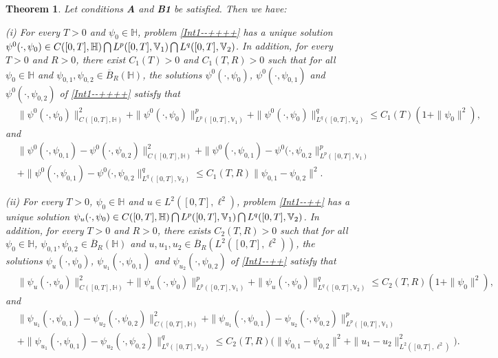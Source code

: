 \documentclass[11pt]{article}
\renewcommand{\leq}{\leqslant}
\newtheorem{theorem}{Theorem}[section]
\numberwithin{equation}{section}
\begin{document}
\begin{theorem}\label{Con1}
Let conditions {\bf A} and {\bf B1} be satisfied.
Then we have:

(i) For every $T>0$ and $\psi_0\in \mathbb{H}$, problem \eqref{Int1--++++} has a unique solution $\psi^0(\cdot,\psi_0)\in
C([0,T],\mathbb{H} )\bigcap L^p([0,T], \mathbb{V}_1  )\\ \bigcap L^q([0,T], \mathbb{V}_2)$. In addition, for every $T>0$ and $R>0$, there exist $C_1(T)>0$ and $C_1(T,R)>0$ such that for all $\psi_{0}\in\mathbb{H}$ and $\psi_{0,1},\psi_{0,2}\in \overline{B}_{R}(\mathbb{H})$,
the solutions $\psi^0(\cdot,\psi_0)$, $\psi^0(\cdot,\psi_{0,1})$
and $\psi^0(\cdot,\psi_{0,2})$ of  \eqref{Int1--++++} satisfy that
\begin{align}\label{Con2}
&\|\psi^0(\cdot,\psi_0)\|^2_{C([0,T],\mathbb{H} )}+
\|\psi^0(\cdot,\psi_0)\|^p_{L^p([0,T],\mathbb{V}_1 )}+\|\psi^0(\cdot,\psi_0)\|^q_{L^q([0,T], \mathbb{V}_2)}\leq C_1(T)(1+\|\psi_0\|^2),
\end{align}
and
\begin{align}\label{Con3}&
\|\psi^0(\cdot,\psi_{0,1})-
\psi^0(\cdot,\psi_{0,2})
\|^2_{C([0,T],\mathbb{H} )}+
\|\psi^0(\cdot,\psi_{0,1})-
\psi^0(\cdot,\psi_{0,2}\|^p_{L^p([0,T], \mathbb{V}_1)}\nonumber\\&   +\|\psi^0(\cdot,\psi_{0,1})-
\psi^0(\cdot,\psi_{0,2}\|^q_{L^q([0,T], \mathbb{V}_2)}\leq C_1(T,R)\|
\psi_{0,1}-
\psi_{0,2}
\|^2.
\end{align}


(ii) For every $T>0$, $\psi_0\in \mathbb{H}$ and $u\in L^2([0,T],\ell^2)$, problem \eqref{Int1--++} has a unique solution $\psi_u(\cdot,\psi_0) \in
C([0,T],\mathbb{H} )\\ \bigcap L^p([0,T], \mathbb{V}_1  ) \bigcap L^q([0,T], \mathbb{V}_2)$. In addition, for every $T>0$ and $R>0$, there exists $C_2(T,R)>0$ such that for all $\psi_{0}\in\mathbb{H}$, $\psi_{0,1},\psi_{0,2}\in \overline{B}_{R}(\mathbb{H})$ and
$u,u_1,u_2\in \overline{B}_{R}(L^2([0,T],\ell^2))$,
the solutions $\psi_u(\cdot,\psi_0)$, $\psi_{u_1}(\cdot,\psi_{0,1})$ and $\psi_{u_2}(\cdot,\psi_{0,2})$ of \eqref{Int1--++} satisfy that
\begin{align}\label{Con4}
&\|\psi_u(\cdot,\psi_0)
\|^2_{C([0,T],\mathbb{H} )}+
\|\psi_u(\cdot,\psi_0)\|^p_{L^p([0,T],\mathbb{V}_1 )}+\|\psi_u(\cdot,\psi_0)\|^q_{L^q([0,T], \mathbb{V}_2)}\leq C_2(T,R)(1+\|\psi_0\|^2),
\end{align}
and
\begin{align}\label{Con5}&
\|\psi_{u_1}(\cdot,\psi_{0,1})-
\psi_{u_2}(\cdot,\psi_{0,2})\|^2_{C([0,T],
\mathbb{H} )}+
\|\psi_{u_1}(\cdot,\psi_{0,1})-
\psi_{u_2}(\cdot,\psi_{0,2})\|^p_{L^p([0,T], \mathbb{V}_1)}\nonumber\\&   +\|\psi_{u_1}(\cdot,\psi_{0,1})-
\psi_{u_2}(\cdot,\psi_{0,2})\|^q_{L^q([0,T], \mathbb{V}_2)}\leq C_2(T,R)
\Big(\|
\psi_{0,1}-
\psi_{0,2}
\|^2+\|u_1-u_2
\|^2_{L^2([0,T],\ell^2)}\Big).
\end{align}\end{theorem}
\end{document}
